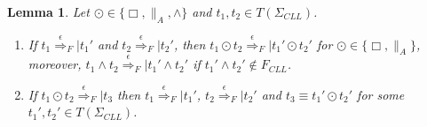 \documentclass{elsarticle}
\theoremstyle{plain}
\newtheorem{lemma}[theorem]{Lemma}
\theoremstyle{definition}
\begin{document}
\begin{lemma}\label{L:TAU_I}
  Let $\odot \in \{\Box,\parallel_A,\wedge\}$ and $t_1,t_2 \in T(\Sigma_{CLL})$.
    \begin{enumerate}
      \item If $t_1 \stackrel{\epsilon}{\Longrightarrow}_F| t_1'$ and $t_2 \stackrel{\epsilon}{\Longrightarrow}_F|t_2'$, then $t_1 \odot t_2 \stackrel{\epsilon}{\Longrightarrow}_F| t_1' \odot t_2'$  for $\odot \in \{\Box,\parallel_A\}$,
           moreover, $t_1\wedge t_2 \stackrel{\epsilon}{\Longrightarrow}_F| t_1' \wedge t_2'$ if $t_1' \wedge t_2' \notin F_{{CLL}}$.
      \item If $t_1 \odot t_2 \stackrel{\epsilon}{\Longrightarrow}_F| t_3$ then $t_1 \stackrel{\epsilon}{\Longrightarrow}_F| t_1'$, $t_2 \stackrel{\epsilon}{\Longrightarrow}_F|t_2'$ and $t_3 \equiv t_1' \odot t_2'$ for some $t_1', t_2' \in T(\Sigma_{CLL})$.
    \end{enumerate}
\end{lemma}
\end{document}
